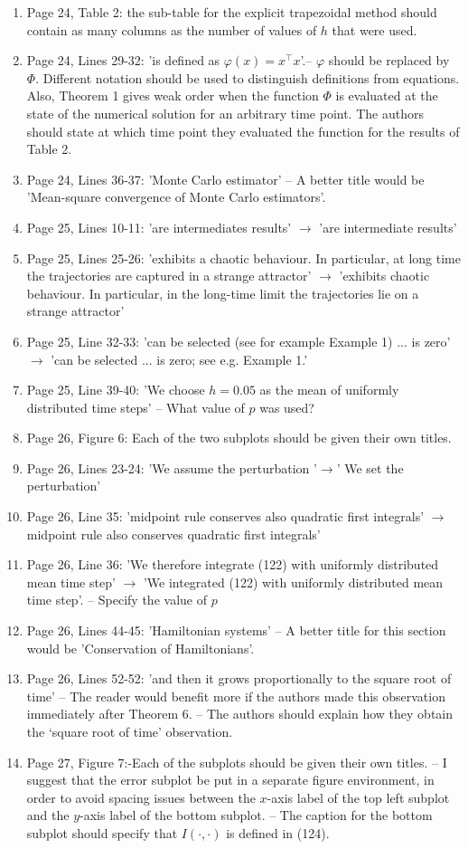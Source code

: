 \documentclass{article}
\begin{document}
\begin{enumerate}[label=(\arabic*)]
		\item Page 24, Table 2: the sub-table for the explicit trapezoidal method should contain as many columns as the number of values of $h$ that were used.
		\item Page 24, Lines 29-32: 'is defined as $\varphi(x)=x^\top x$'.-- $\varphi$ should be replaced by $\Phi$. Different notation should be used to distinguish definitions from equations. Also, Theorem 1 gives weak order when the function $\Phi$ is evaluated at the state of the numerical solution for an arbitrary time point. The authors should state at which time point they evaluated the function for the results of Table 2.
		\item Page 24, Lines 36-37: 'Monte Carlo estimator' -- A better title would be 'Mean-square convergence of Monte Carlo estimators'.
		\item Page 25, Lines 10-11: 'are intermediates results' $\to$ 'are intermediate results'
		\item Page 25, Lines 25-26: 'exhibits a chaotic behaviour. In particular, at long time the trajectories are captured in a strange attractor' $\to$ 'exhibits chaotic behaviour. In particular, in the long-time limit the trajectories lie on a strange attractor'
		\item Page 25, Line 32-33: 'can be selected (see for example Example 1) ... is zero' $\to$ 'can be selected ... is zero; see e.g. Example 1.'
		\item Page 25, Line 39-40: 'We choose $h=0.05$ as the mean of uniformly distributed time steps' -- What value of $p$ was used?
		\item Page 26, Figure 6: Each of the two subplots should be given their own titles.
		\item Page 26, Lines 23-24: 'We assume the perturbation '$\to$' We set the perturbation'
		\item Page 26, Line 35: 'midpoint rule conserves also quadratic first integrals' $\to$ midpoint rule also conserves quadratic first integrals'
		\item Page 26, Line 36: 'We therefore integrate (122) with uniformly distributed mean time step' $\to$ 'We integrated (122) with uniformly distributed mean time step'. -- Specify the value of $p$
		\item Page 26, Lines 44-45: 'Hamiltonian systems' -- A better title for this section would be 'Conservation of Hamiltonians'.
		\item Page 26, Lines 52-52: 'and then it grows proportionally to the square root of time' -- The reader would benefit more if the authors made this observation immediately after Theorem 6. -- The authors should explain how they obtain the `square root of time' observation. \item Page 27, Figure 7:-Each of the subplots should be given their own titles. -- I suggest that the error subplot be put in a separate figure environment, in order to avoid spacing issues between the $x$-axis label of the top left subplot and the $y$-axis label of the bottom subplot. -- The caption for the bottom subplot should specify that $I(\cdot,\cdot)$ is defined in (124).

\end{enumerate}
\end{document}
